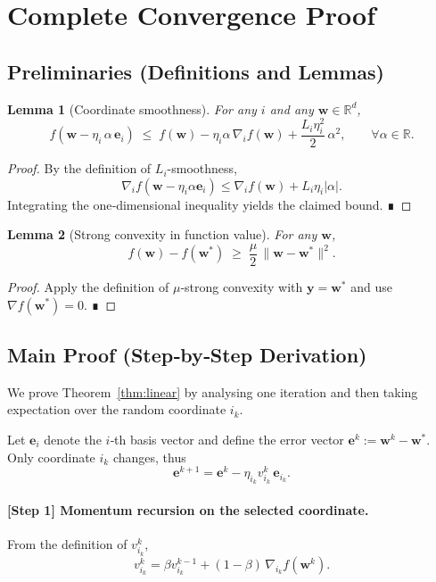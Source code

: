\documentclass[11pt]{article}
\newtheorem{lemma}{Lemma}[section]
\begin{document}
\section*{Complete Convergence Proof}

\subsection{Preliminaries (Definitions and Lemmas)}
\begin{lemma}[Coordinate smoothness]\label{lem:smooth}
For any $i$ and any $\mathbf w\in\mathbb R^{d}$,
\[
f(\mathbf w - \eta_i \, \alpha \,\mathbf e_i)
\;\le\;
f(\mathbf w) - \eta_i \alpha \,\nabla_i f(\mathbf w)
    +\frac{L_i\eta_i^{2}}{2}\,\alpha^{2},
\qquad\forall\alpha\in\mathbb R .
\]
\end{lemma}
\begin{proof}
By the definition of $L_i$-smoothness,
\[
\nabla_i f(\mathbf w-\eta_i\alpha\mathbf e_i)
\le \nabla_i f(\mathbf w) + L_i\eta_i|\alpha| .
\]
Integrating the one‑dimensional inequality yields the claimed bound. ∎
\end{proof}

\begin{lemma}[Strong convexity in function value]\label{lem:sc}
For any $\mathbf w$,
\[
f(\mathbf w)-f(\mathbf w^{*})
\;\ge\;
\frac{\mu}{2}\,\|\mathbf w-\mathbf w^{*}\|^{2}.
\]
\end{lemma}
\begin{proof}
Apply the definition of $\mu$‑strong convexity with $\mathbf y=\mathbf w^{*}$
and use $\nabla f(\mathbf w^{*})=0$. ∎
\end{proof}

\subsection{Main Proof (Step‑by‑Step Derivation)}
We prove Theorem~\ref{thm:linear} by analysing one iteration and then
taking expectation over the random coordinate $i_k$.

Let $\mathbf e\!_{i}$ denote the $i$‑th basis vector and define the error
vector $\mathbf e^{k}:=\mathbf w^{k}-\mathbf w^{*}$.
Only coordinate $i_k$ changes, thus
\[
\mathbf e^{k+1}= \mathbf e^{k}
- \eta_{i_k} v_{i_k}^{k}\,\mathbf e_{i_k}.
\tag{1}
\label{eq:update}
\]

\paragraph{[Step 1] Momentum recursion on the selected coordinate.}
From the definition of $v_{i_k}^{k}$,
\[
v_{i_k}^{k}= \beta v_{i_k}^{k-1} + (1-\beta)\,\nabla_{i_k} f(\mathbf w^{k}).
\tag{2}
\label{eq:momentum}
\]
\end{document}
